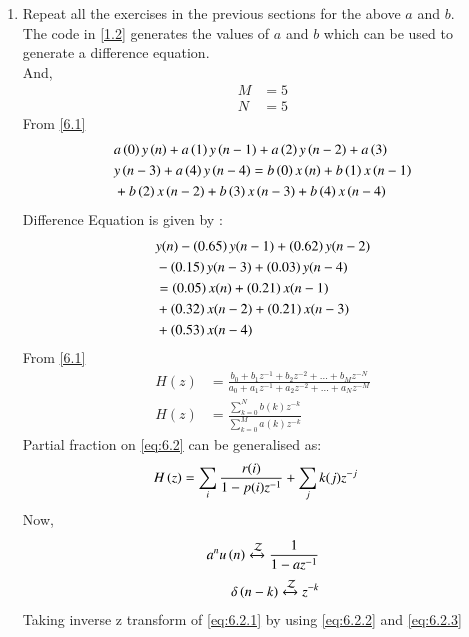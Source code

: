 \documentclass[journal,12pt,twocolumn]{IEEEtran}
\newcommand{\systemZ}[1]{\stackrel{#1}{\mathcal{Z}}}
\theoremstyle{remark}
\begin{document}
\begin{enumerate}[label=\thesection.\arabic*]
\item Repeat all the exercises in the previous sections for the above $a$ and $b$.\\
\solution The code in \ref{1.2} generates the values of $a$ and $b$  which can be used to generate a difference equation.\\
And,
\begin{align}
    M &= 5\\
    N&=5
\end{align}
From \ref{6.1} 
\begin{align}
    &a\left(0\right)y\left(n\right) + a\left(1\right)y\left(n-1\right)+a\left(2\right)y\left(n-2\right)+a\left(3\right)\\ \notag &y\left(n-3\right) + a\left(4\right)y\left(n-4\right) =   b\left(0\right)x\left(n\right) + b\left(1\right)x\left(n-1\right)\\ \notag &+b\left(2\right)x\left(n-2\right)+b\left(3\right)x\left(n-3\right) + b\left(4\right)x\left(n-4\right) 
\end{align}
Difference Equation is given by :
\begin{align}
	&y(n) - \left(0.65\right)y(n - 1) + \left(0.62\right)y(n - 2) \nonumber \\
	&- \left(0.15\right)y(n - 3) + \left(0.03\right)y(n - 4) \nonumber \\
	&= \left(0.05\right)x(n) + \left(0.21\right)x(n - 1) \nonumber \\
	&+ \left(0.32\right)x(n - 2) + \left(0.21\right)x(n - 3) \nonumber \\
	&+ \left(0.53\right)x(n - 4)
\end{align}
From \eqref{6.1} 
\begin{align}
    H(z) &= \frac{b_0 + b_1 z^{-1} + b_2 z^{-2} + \ldots + b_M z^{-N}}{a_0 + a_1 z^{-1} + a_2 z^{-2} + \ldots + a_N z^{-M}}\\
    H(z) &= \frac{\sum_{k = 0}^{N}b(k)z^{-k}}{\sum_{k = 0}^{M}a(k)z^{-k}} \label{eq:7.2}
\end{align}
Partial fraction on \eqref{eq:6.2} can be generalised as:
\begin{align}
    H\left(z\right)&= \sum_{i}\frac{r(i)}{1 - p(i)z^{-1}} + \sum_{j}k(j)z^{-j}
	\label{eq:6.2.1}
\end{align}
Now,
\begin{align}
    a^{n}u\brak{n} \xleftrightarrow{\systemZ{}}  \frac{1}{1-az^{-1}} \label{eq:6.2.2}\\
    \delta\brak{n-k} \xleftrightarrow{\systemZ{}} z^{-k}\label{eq:6.2.3}
\end{align}
Taking inverse z transform of \eqref{eq:6.2.1} by using \eqref{eq:6.2.2} and \eqref{eq:6.2.3}
\begin{align}

\end{align}
\end{enumerate}
\end{document}
